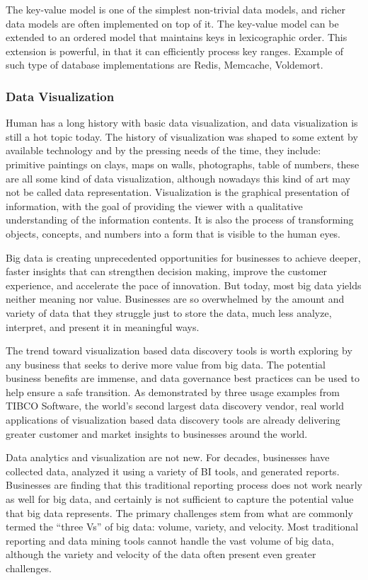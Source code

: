 The key-value model is one of the simplest non-trivial data models, and richer data models are often implemented on top of it. The key-value model can be extended to an ordered model that maintains keys in lexicographic order. This extension is powerful, in that it can efficiently process key ranges. Example of such type of database implementations are Redis, Memcache, Voldemort.

\subsubsection{Data Visualization}
Human has a long history with basic data visualization, and data visualization is still a hot topic today. The history of visualization was shaped to some extent by available technology and by the pressing needs of the time, they include: primitive paintings on clays, maps on walls, photographs, table of numbers, these are all some kind of data visualization, although nowadays this kind of art may not be called data representation. Visualization is the graphical presentation of information, with the goal of providing the viewer with a qualitative understanding of the information contents. It is also the process of transforming objects, concepts, and numbers into a form that is visible to the human eyes.

Big data is creating unprecedented opportunities for businesses to achieve deeper, faster insights that can strengthen decision making, improve the customer experience, and accelerate the pace of innovation. But today, most big data yields neither meaning nor value. Businesses are so overwhelmed by the amount and variety of data that they struggle just to store the data, much less analyze, interpret, and present it in meaningful ways.

The trend toward visualization based data discovery tools is worth exploring by any business that seeks to derive more value from big data. The potential business benefits are immense, and data governance best practices can be used to help ensure a safe transition. As demonstrated by three usage examples from TIBCO Software, the world’s second largest data discovery vendor, real world applications of visualization based data discovery tools are already delivering greater customer and market insights to businesses around the world.

Data analytics and visualization are not new. For decades, businesses have collected data, analyzed it using a variety of BI tools, and generated reports. Businesses are finding that this traditional reporting process does not work nearly as well for big data, and certainly is not sufficient to capture the potential value that big data represents. The primary challenges stem from what are commonly termed the “three Vs” of big data: volume, variety, and velocity. Most traditional reporting and data mining tools cannot handle the vast volume of big data, although the variety and velocity of the data often present even greater challenges.

